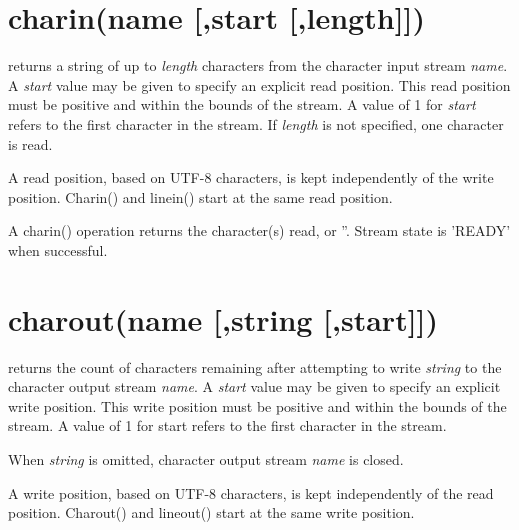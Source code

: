 \label{refrexxstream}


\section{charin(name [,start [,length{]}{]})}
returns a string of up to \emph{length} characters from
the character input stream  \emph{name}. A \emph{start} value may be given to specify
an explicit read position. This read position must be positive and within
the bounds of the stream. A value of 1 for \emph{start} refers to the first character in the stream.
If \emph{length} is not specified, one character is read.

A read position, based on UTF-8 characters, is kept independently of the write position.
Charin() and linein() start at the same read position.

A charin() operation returns the character(s) read, or ''. Stream state is 'READY' when successful.

\section{charout(name [,string [,start{]}{]})}
returns the count of characters remaining after attempting to
write \emph{string} to the character output stream \emph{name}. A \emph{start} value may be given
to specify an explicit write position. This write position must be positive and within the
bounds of the stream. A value of 1 for start refers to the first character in the stream.

When \emph{string} is omitted, character output stream \emph{name} is closed.

A write position, based on UTF-8 characters, is kept independently of the read position.
Charout() and lineout() start at the same write position.

